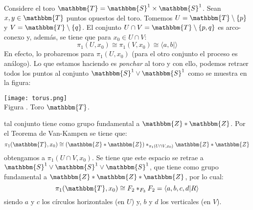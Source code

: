 \documentclass[12pt]{report}
\newcounter{it}
\theoremstyle{largebreak}
\newcommand{\bbm}[1]{\ensuremath{\mathbbm{#1}}}
\newcommand{\gen}[1]{\ensuremath{\langle#1\rangle}}
\newcounter{figcount}
\begin{document}
    \begin{sol}
        Considere el toro $\bbm{T}=\bbm{S}^1\times\bbm{S}^1$. Sean $x,y\in\bbm{T}$ puntos opuestos del toro. Tomemos $U=\bbm{T}\setminus\left\{p \right\}$ y $V=\bbm{T}\setminus\left\{q\right\}$. El conjunto $U\cap V=\bbm{T}\setminus\left\{p,q \right\}$ es arco-conexo y, además, se tiene que para $x_0\in U\cap V$:
        \begin{equation*}
            \pi_1(U,x_0)\cong\pi_1(V,x_0)\cong\gen{a,b|}
        \end{equation*}
        En efecto, lo probaremos para $\pi_1(U,x_0)$ (para el otro conjunto el proceso es análogo). Lo que estamos haciendo es \textit{ponchar} al toro y con ello, podemos retraer todos los puntos al conjunto $\bbm{S}^1\lor\bbm{S}^1$ como se muestra en la figura:

        \begin{minipage}{\textwidth}
            \begin{center}
                \texttt{[image: torus.png]}\\
                Figura \thefigcount. Toro $\bbm{T}$.
            \end{center}
        \end{minipage}
        
        tal conjunto tiene como grupo fundamental a $\bbm{Z}*\bbm{Z}$. Por el Teorema de Van-Kampen se tiene que:
        \begin{equation*}
            \pi_1(\bbm{T},x_0)\cong(\bbm{Z}*\bbm{Z})*_{\pi_1(U\cap V,x_0)}\bbm{Z}*\bbm{Z}
        \end{equation*}
        obtengamos a $\pi_1(U\cap V,x_0)$. Se tiene que este espacio se retrae a $\bbm{S}^1\lor\bbm{S}^1\lor\bbm{S}^1$, que tiene como grupo fundamental a $\bbm{Z}*\bbm{Z}*\bbm{Z}$, por lo cual:
        \begin{equation*}
            \pi_1(\bbm{T},x_0)\cong F_2*_{F_3}F_2=\gen{a,b,c,d|R}
        \end{equation*}
        siendo $a$ y $c$ los círculos horizontales (en $U$) y, $b$ y $d$ los verticales (en $V$).


\end{sol}
\end{document}
